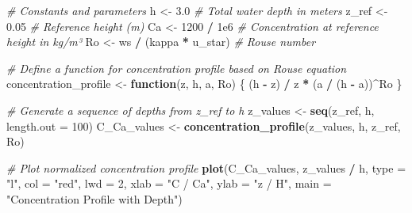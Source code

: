 \documentclass[
]{article}
\newenvironment{Shaded}{\begin{snugshade}}{\end{snugshade}}
\newcommand{\AttributeTok}[1]{\textcolor[rgb]{0.13,0.29,0.53}{#1}}
\newcommand{\CommentTok}[1]{\textcolor[rgb]{0.56,0.35,0.01}{\textit{#1}}}
\newcommand{\ControlFlowTok}[1]{\textcolor[rgb]{0.13,0.29,0.53}{\textbf{#1}}}
\newcommand{\DecValTok}[1]{\textcolor[rgb]{0.00,0.00,0.81}{#1}}
\newcommand{\FloatTok}[1]{\textcolor[rgb]{0.00,0.00,0.81}{#1}}
\newcommand{\FunctionTok}[1]{\textcolor[rgb]{0.13,0.29,0.53}{\textbf{#1}}}
\newcommand{\NormalTok}[1]{#1}
\newcommand{\OtherTok}[1]{\textcolor[rgb]{0.56,0.35,0.01}{#1}}
\newcommand{\SpecialCharTok}[1]{\textcolor[rgb]{0.81,0.36,0.00}{\textbf{#1}}}
\newcommand{\StringTok}[1]{\textcolor[rgb]{0.31,0.60,0.02}{#1}}
\begin{document}
\begin{Shaded}
\begin{Highlighting}[]
\CommentTok{\# Constants and parameters}
\NormalTok{h }\OtherTok{\textless{}{-}} \FloatTok{3.0}                      \CommentTok{\# Total water depth in meters}
\NormalTok{z\_ref }\OtherTok{\textless{}{-}} \FloatTok{0.05}                 \CommentTok{\# Reference height (m)}
\NormalTok{Ca }\OtherTok{\textless{}{-}} \DecValTok{1200} \SpecialCharTok{/} \FloatTok{1e6}              \CommentTok{\# Concentration at reference height in kg/m³}
\NormalTok{Ro }\OtherTok{\textless{}{-}}\NormalTok{ ws }\SpecialCharTok{/}\NormalTok{ (kappa }\SpecialCharTok{*}\NormalTok{ u\_star)   }\CommentTok{\# Rouse number }

\CommentTok{\# Define a function for concentration profile based on Rouse equation}
\NormalTok{concentration\_profile }\OtherTok{\textless{}{-}} \ControlFlowTok{function}\NormalTok{(z, h, a, Ro) \{}
\NormalTok{  (h }\SpecialCharTok{{-}}\NormalTok{ z) }\SpecialCharTok{/}\NormalTok{ z }\SpecialCharTok{*}\NormalTok{ (a }\SpecialCharTok{/}\NormalTok{ (h }\SpecialCharTok{{-}}\NormalTok{ a))}\SpecialCharTok{\^{}}\NormalTok{Ro}
\NormalTok{\}}

\CommentTok{\# Generate a sequence of depths from z\_ref to h}
\NormalTok{z\_values }\OtherTok{\textless{}{-}} \FunctionTok{seq}\NormalTok{(z\_ref, h, }\AttributeTok{length.out =} \DecValTok{100}\NormalTok{)}
\NormalTok{C\_Ca\_values }\OtherTok{\textless{}{-}} \FunctionTok{concentration\_profile}\NormalTok{(z\_values, h, z\_ref, Ro)}

\CommentTok{\# Plot normalized concentration profile}
\FunctionTok{plot}\NormalTok{(C\_Ca\_values, z\_values }\SpecialCharTok{/}\NormalTok{ h, }\AttributeTok{type =} \StringTok{"l"}\NormalTok{, }\AttributeTok{col =} \StringTok{"red"}\NormalTok{, }\AttributeTok{lwd =} \DecValTok{2}\NormalTok{,}
     \AttributeTok{xlab =} \StringTok{"C / Ca"}\NormalTok{, }\AttributeTok{ylab =} \StringTok{"z / H"}\NormalTok{, }\AttributeTok{main =} \StringTok{"Concentration Profile with Depth"}\NormalTok{)}
\end{Highlighting}
\end{Shaded}
\end{document}
